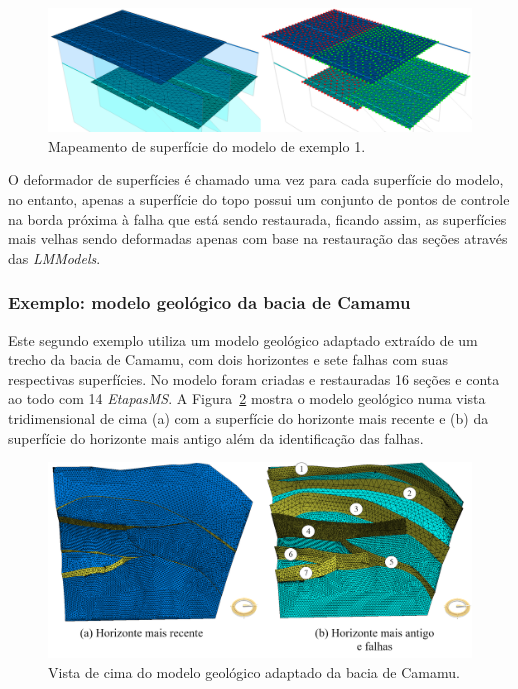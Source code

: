 \begin{figure} [H]
  \begin{center}
    \includegraphics[width=\textwidth]{images/fig-example-1-5}
    \caption{Mapeamento de superfície do modelo de exemplo 1.}\label{fig-example-1-5}
  \end{center}
\end{figure}

O deformador de superfícies é chamado uma vez para cada superfície do modelo, no entanto, apenas a superfície do topo possui um conjunto de pontos de controle na borda próxima à falha que está sendo restaurada, ficando assim, as superfícies mais velhas sendo deformadas apenas com base na restauração das seções através das \textit{LMModels}.

\subsubsection{Exemplo: modelo geológico da bacia de Camamu}

Este segundo exemplo utiliza um modelo geológico adaptado extraído de um trecho da bacia de Camamu\cite{Camamu}, com dois horizontes e sete falhas com suas respectivas superfícies. No modelo foram criadas e restauradas 16 seções e conta ao todo com 14 \textit{EtapasMS}. A Figura~\ref{fig-example-2-1} mostra o modelo geológico numa vista tridimensional de cima (a) com a superfície do horizonte mais recente e (b) da superfície do horizonte mais antigo além da identificação das falhas.

\begin{figure} [H]
  \begin{center}
    \includegraphics[width=\textwidth]{images/fig-example-2-1}
    \caption{Vista de cima do modelo geológico adaptado da bacia de Camamu.}\label{fig-example-2-1}
  \end{center}
\end{figure}

